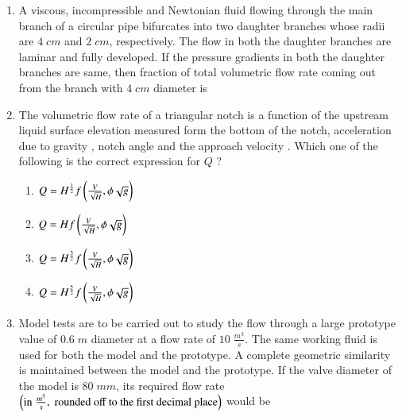 \documentclass[journal,12pt,onecolumn]{IEEEtran}
\theoremstyle{remark}
\begin{document}
\begin{enumerate}[start=27]
\item A viscous, incompressible and Newtonian fluid flowing through the main branch of a circular pipe bifurcates into two daughter branches whose radii are $4\;cm$ and $2\;cm$, respectively. The flow in both the daughter branches are laminar and fully developed. If the pressure gradients in both the daughter branches are same, then fraction of total volumetric flow rate  coming out from the branch with $4\;cm$ diameter is \underline{\hspace{2cm}} 
\begin{figure}[!ht]
\centering
{}%

\end{figure}

\item The volumetric flow rate  of a triangular notch is a function of the upstream liquid surface elevation  measured form the bottom of the notch, acceleration due to gravity , notch angle \brak{\phi} and the approach velocity . Which one of the following is the correct expression for $Q$ ?
\begin{enumerate}
    \item $Q=H^\frac{1}{2}f\left(\frac{V}{\sqrt{H}},\phi\sqrt{g}\right)$
    \item $Q=H f\left(\frac{V}{\sqrt{H}},\phi\sqrt{g}\right)$
    \item $Q=H^\frac{3}{2}f\left(\frac{V}{\sqrt{H}},\phi\sqrt{g}\right)$
    \item $Q=H^\frac{5}{2}f\left(\frac{V}{\sqrt{H}},\phi\sqrt{g}\right)$
\end{enumerate}
\item Model tests are to be carried out to study the flow through a large prototype value of $0.6\;m$ diameter at a flow rate of $10\;\frac{m^3}{s}$. The same working fluid is used for both the model and the prototype. A complete geometric similarity is maintained between the model and the prototype. If the valve diameter of the model is $80\;mm$, its required flow rate $\left(\text{in}\;\frac{m^3}{s},\;\text{rounded off to the first decimal place}\right)$ would be \underline{\hspace{2cm}} 
\end{enumerate}
\end{document}
